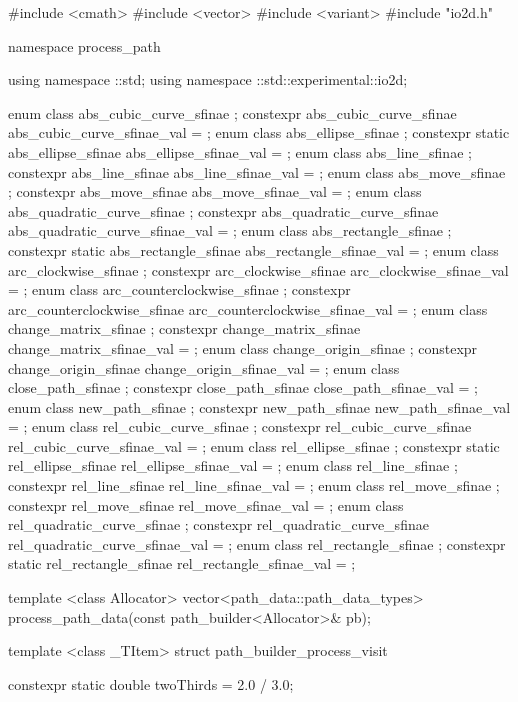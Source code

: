 
\begin{codeblock}
  #include <cmath>
  #include <vector>
  #include <variant>
  #include "io2d.h"
  
  
  namespace process_path {
    using namespace ::std;
    using namespace ::std::experimental::io2d;
  
    enum class abs_cubic_curve_sfinae {};
    constexpr abs_cubic_curve_sfinae abs_cubic_curve_sfinae_val = {};
    enum class abs_ellipse_sfinae {};
    constexpr static abs_ellipse_sfinae abs_ellipse_sfinae_val = {};
    enum class abs_line_sfinae {};
    constexpr abs_line_sfinae abs_line_sfinae_val = {};
    enum class abs_move_sfinae {};
    constexpr abs_move_sfinae abs_move_sfinae_val = {};
    enum class abs_quadratic_curve_sfinae {};
    constexpr abs_quadratic_curve_sfinae abs_quadratic_curve_sfinae_val = {};
    enum class abs_rectangle_sfinae {};
    constexpr static abs_rectangle_sfinae abs_rectangle_sfinae_val = {};
    enum class arc_clockwise_sfinae {};
    constexpr arc_clockwise_sfinae arc_clockwise_sfinae_val = {};
    enum class arc_counterclockwise_sfinae {};
    constexpr arc_counterclockwise_sfinae arc_counterclockwise_sfinae_val = {};
    enum class change_matrix_sfinae {};
    constexpr change_matrix_sfinae change_matrix_sfinae_val = {};
    enum class change_origin_sfinae {};
    constexpr change_origin_sfinae change_origin_sfinae_val = {};
    enum class close_path_sfinae {};
    constexpr close_path_sfinae close_path_sfinae_val = {};
    enum class new_path_sfinae {};
    constexpr new_path_sfinae new_path_sfinae_val = {};
    enum class rel_cubic_curve_sfinae {};
    constexpr rel_cubic_curve_sfinae rel_cubic_curve_sfinae_val = {};
    enum class rel_ellipse_sfinae {};
    constexpr static rel_ellipse_sfinae rel_ellipse_sfinae_val = {};
    enum class rel_line_sfinae {};
    constexpr rel_line_sfinae rel_line_sfinae_val = {};
    enum class rel_move_sfinae {};
    constexpr rel_move_sfinae rel_move_sfinae_val = {};
    enum class rel_quadratic_curve_sfinae {};
    constexpr rel_quadratic_curve_sfinae rel_quadratic_curve_sfinae_val = {};
    enum class rel_rectangle_sfinae {};
    constexpr static rel_rectangle_sfinae rel_rectangle_sfinae_val = {};
  
    template <class Allocator>
    vector<path_data::path_data_types> process_path_data(const path_builder<Allocator>& pb);
  
    template <class _TItem>
    struct path_builder_process_visit {
      constexpr static double twoThirds = 2.0 / 3.0;
  
}}
\end{codeblock}
